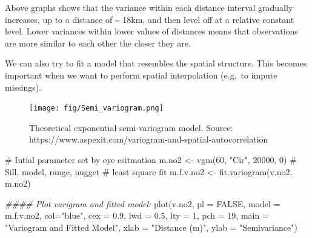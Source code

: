 \documentclass[
  letterpaper,
]{scrbook}
\newenvironment{Shaded}{\begin{snugshade}}{\end{snugshade}}
\newcommand{\AttributeTok}[1]{\textcolor[rgb]{0.40,0.45,0.13}{#1}}
\newcommand{\CommentTok}[1]{\textcolor[rgb]{0.37,0.37,0.37}{#1}}
\newcommand{\ConstantTok}[1]{\textcolor[rgb]{0.56,0.35,0.01}{#1}}
\newcommand{\DecValTok}[1]{\textcolor[rgb]{0.68,0.00,0.00}{#1}}
\newcommand{\DocumentationTok}[1]{\textcolor[rgb]{0.37,0.37,0.37}{\textit{#1}}}
\newcommand{\FloatTok}[1]{\textcolor[rgb]{0.68,0.00,0.00}{#1}}
\newcommand{\FunctionTok}[1]{\textcolor[rgb]{0.28,0.35,0.67}{#1}}
\newcommand{\NormalTok}[1]{\textcolor[rgb]{0.00,0.23,0.31}{#1}}
\newcommand{\OtherTok}[1]{\textcolor[rgb]{0.00,0.23,0.31}{#1}}
\newcommand{\StringTok}[1]{\textcolor[rgb]{0.13,0.47,0.30}{#1}}
\begin{document}
Above graphs shows that the variance within each distance interval
gradually increases, up to a distance of \textasciitilde{} 18km, and
then level off at a relative constant level. Lower variances within
lower values of distances means that observations are more similar to
each other the closer they are.

We can also try to fit a model that resembles the spatial structure.
This becomes important when we want to perform spatial interpolation
(e.g.~to impute missings).

\begin{figure}

{\centering \texttt{[image: fig/Semi\_variogram.png]}

}

\caption{Theoretical exponential semi-variogram model. Source:
https://www.aspexit.com/variogram-and-spatial-autocorrelation}

\end{figure}

\begin{Shaded}
\begin{Highlighting}[]
\CommentTok{\# Intial parameter set by eye esitmation}
\NormalTok{m.no2 }\OtherTok{\textless{}{-}} \FunctionTok{vgm}\NormalTok{(}\DecValTok{60}\NormalTok{, }\StringTok{"Cir"}\NormalTok{, }\DecValTok{20000}\NormalTok{, }\DecValTok{0}\NormalTok{)  }\CommentTok{\# Sill, model, range, nugget}
\CommentTok{\# least square fit}
\NormalTok{m.f.v.no2 }\OtherTok{\textless{}{-}} \FunctionTok{fit.variogram}\NormalTok{(v.no2, m.no2)}
\end{Highlighting}
\end{Shaded}

\begin{Shaded}
\begin{Highlighting}[]
\DocumentationTok{\#\#\#\# Plot varigram and fitted model:}
\FunctionTok{plot}\NormalTok{(v.no2, }\AttributeTok{pl =} \ConstantTok{FALSE}\NormalTok{, }
     \AttributeTok{model =}\NormalTok{ m.f.v.no2,}
     \AttributeTok{col=}\StringTok{"blue"}\NormalTok{, }
     \AttributeTok{cex =} \FloatTok{0.9}\NormalTok{, }
     \AttributeTok{lwd =} \FloatTok{0.5}\NormalTok{,}
     \AttributeTok{lty =} \DecValTok{1}\NormalTok{,}
     \AttributeTok{pch =} \DecValTok{19}\NormalTok{,}
     \AttributeTok{main =} \StringTok{"Variogram and Fitted Model"}\NormalTok{,}
     \AttributeTok{xlab =} \StringTok{"Distance (m)"}\NormalTok{,}
     \AttributeTok{ylab =} \StringTok{"Semivariance"}\NormalTok{)}
\end{Highlighting}
\end{Shaded}
\end{document}
